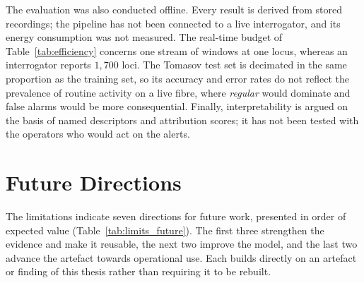 The evaluation was also conducted offline. Every result is derived from stored recordings; the pipeline has not been connected to a live interrogator, and its energy consumption was not measured. The real-time budget of Table~\ref{tab:efficiency} concerns one stream of windows at one locus, whereas an interrogator reports $1{,}700$ loci. The Tomasov test set is decimated in the same proportion as the training set, so its accuracy and error rates do not reflect the prevalence of routine activity on a live fibre, where \emph{regular} would dominate and false alarms would be more consequential. Finally, interpretability is argued on the basis of named descriptors and attribution scores; it has not been tested with the operators who would act on the alerts.

\section{Future Directions}
\label{sec:chap5Future}
The limitations indicate seven directions for future work, presented in order of expected value (Table~\ref{tab:limits_future}). The first three strengthen the evidence and make it reusable, the next two improve the model, and the last two advance the artefact towards operational use. Each builds directly on an artefact or finding of this thesis rather than requiring it to be rebuilt.

